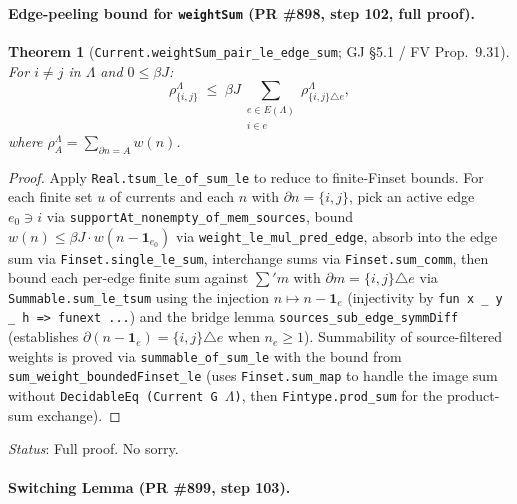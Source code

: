 \documentclass[a4paper,11pt]{article}
\newtheorem{theorem}{Theorem}
\newcommand{\LeanLambda}{\texorpdfstring{\ensuremath{\Lambda}}{Lambda}}
\begin{document}
\paragraph{Edge-peeling bound for \texttt{weightSum} (PR \#898, step 102, full proof).}

\begin{theorem}[\texttt{Current.weightSum\_pair\_le\_edge\_sum}; GJ \S5.1 / FV Prop.~9.31]
  For $i \ne j$ in $\Lambda$ and $0 \le \beta J$:
  \[
    \rho^{\Lambda}_{\{i,j\}} \;\le\; \beta J \sum_{\substack{e \in E(\Lambda) \\ i \in e}}
      \rho^{\Lambda}_{\{i,j\} \triangle e},
  \]
  where $\rho^{\Lambda}_A = \sum_{\partial n = A} w(n)$.
\end{theorem}
\begin{proof}
Apply \texttt{Real.tsum\_le\_of\_sum\_le} to reduce to finite-Finset bounds.
For each finite set $u$ of currents and each $n$ with $\partial n = \{i,j\}$,
pick an active edge $e_0 \ni i$ via \texttt{supportAt\_nonempty\_of\_mem\_sources},
bound $w(n) \le \beta J \cdot w(n - \mathbf{1}_{e_0})$ via \texttt{weight\_le\_mul\_pred\_edge},
absorb into the edge sum via \texttt{Finset.single\_le\_sum},
interchange sums via \texttt{Finset.sum\_comm}, then bound each per-edge finite
sum against $\sum' m$ with $\partial m = \{i,j\} \triangle e$ via
\texttt{Summable.sum\_le\_tsum} using the injection $n \mapsto n - \mathbf{1}_e$
(injectivity by \texttt{fun x \_ y \_ h => funext ...}) and the bridge lemma
\texttt{sources\_sub\_edge\_symmDiff} (establishes $\partial(n - \mathbf{1}_e) = \{i,j\} \triangle e$
when $n_e \ge 1$).
Summability of source-filtered weights is proved via \texttt{summable\_of\_sum\_le}
with the bound from \texttt{sum\_weight\_boundedFinset\_le} (uses \texttt{Finset.sum\_map}
to handle the image sum without \texttt{DecidableEq (Current G \LeanLambda)}, then
\texttt{Fintype.prod\_sum} for the product-sum exchange).
\end{proof}
\noindent\textit{Status}: Full proof. No sorry.

\paragraph{Switching Lemma (PR \#899, step 103).}
\end{document}
